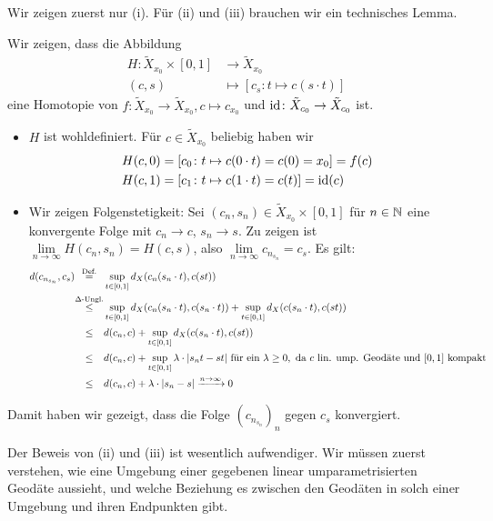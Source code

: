 \begin{beweis}
	Wir zeigen zuerst nur (i).
	Für (ii) und (iii) brauchen wir ein technisches Lemma.
	
	Wir zeigen, dass die Abbildung
	\begin{align*}
		H\colon \tilde{X}_{x_0} \times [0,1] &\longrightarrow \tilde{X}_{x_0} \\
		(c,s) &\longmapsto [c_s \colon t \mapsto c(s \cdot t)]
	\end{align*}
	eine Homotopie von $f\colon \tilde{X}_{x_0} \rightarrow \tilde{X}_{x_0}, c \mapsto c_{x_0}$ und $\operatorname{id}\colon \tilde{X}_{c_0} \rightarrow \tilde{X}_{c_0}$ ist.
	\begin{itemize}
		\item $H$ ist wohldefiniert.
		Für $c \in \tilde{X}_{x_0}$ beliebig haben wir
		\begin{align*}
			H(c,0) &= [c_0 \colon t \mapsto c(0 \cdot t) = c(0) = x_0] = f(c) \\
			H(c,1) &= [c_1 \colon t \mapsto c(1 \cdot t) = c(t)] = \operatorname{id}(c)
		\end{align*}
		\item Wir zeigen Folgenstetigkeit:
		Sei $(c_n,s_n) \in \tilde{X}_{x_0} \times [0,1]$ für $n \in \mathbb{N}$ eine konvergente Folge mit $c_n \rightarrow c$, $s_n \rightarrow s$.
		Zu zeigen ist $\lim\limits_{n \rightarrow \infty} H(c_n,s_n) = H(c,s)$, also $\lim\limits_{n \rightarrow \infty} c_{n_{s_n}} = c_s$.
		Es gilt:
		\begin{align*}
			d(c_{n_{s_n}},c_s) &\stack{\text{Def.}}{=} \sup_{t \in [0,1]} d_X(c_n(s_n \cdot t),c(st)) \\
			&\stack{\Delta\text{-Ungl.}}{\leq} \sup_{t \in [0,1]} d_X(c_n(s_n \cdot t),c(s_n \cdot t)) + \sup_{t \in [0,1]} d_X(c(s_n \cdot t),c(st)) \\
			&\stack{}{\leq} d(c_n,c) + \sup_{t \in [0,1]} d_X(c(s_n \cdot t), c(st)) \\
			&\stack{}{\leq} d(c_n,c) + \sup_{t \in [0,1]} \lambda \cdot \abs{s_n t - st} \text{ für ein } \lambda \geq 0, \text{ da } c \text{ lin. ump. Geodäte und } [0,1] \text{ kompakt} \\
			&\stack{}{\leq} d(c_n,c) + \lambda \cdot \abs{s_n-s} \xrightarrow{n \rightarrow \infty} 0
		\end{align*}
	\end{itemize}
	Damit haben wir gezeigt, dass die Folge $(c_{n_{s_n}})_n$ gegen $c_s$ konvergiert. 
\end{beweis}

Der Beweis von (ii) und (iii) ist wesentlich aufwendiger.
Wir müssen zuerst verstehen, wie eine Umgebung einer gegebenen linear umparametrisierten Geodäte aussieht, und welche Beziehung es zwischen den Geodäten in solch einer Umgebung und ihren Endpunkten gibt.

